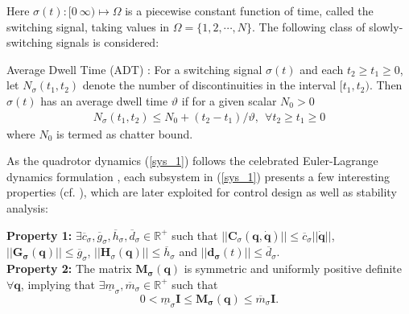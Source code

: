 Here $\sigma(t) : [0~\infty) \mapsto \Omega$ is a piecewise constant function of time, called the switching signal, taking values in $\Omega=\lbrace 1,2, \cdots,N \rbrace $. The following class of slowly-switching signals is considered: %
\begin{mydef}
	Average Dwell Time (ADT) \cite{hespanha1999stability}: For a switching signal $\sigma(t)$ and each $t_2 \geq t_1 \geq 0$, let $N_{\sigma}(t_1,t_2)$ denote the number of discontinuities in the interval $[t_1,t_2)$. Then $\sigma(t)$ has an average dwell time $\vartheta$ if for a given scalar $N_0 >0$
	\begin{align*}
	N_{\sigma}(t_1,t_2) \leq N_0 + (t_2-t_1)/\vartheta,~~ \forall t_2 \geq t_1 \geq 0
	\end{align*}
	where $N_0$ is termed as chatter bound.
\end{mydef}

As the quadrotor dynamics (\ref{sys_1}) follows the celebrated Euler-Lagrange dynamics formulation \cite{tang2015mixed}, each subsystem in (\ref{sys_1}) presents a few interesting properties (cf. \cite{spong2008robot}), which are later exploited for control design as well as stability analysis:

\noindent \textbf{Property 1:} $\exists \overline c_{\sigma }, \overline g_{\sigma }, \overline h_{\sigma },\overline{d}_{\sigma} \in \mathbb{R}^{+}$ such that $||\mathbf C_{\sigma}(\mathbf q,\dot{\mathbf q})|| \leq \overline c_{\sigma } ||\dot{\mathbf q}||$, $||\mathbf{G_{\sigma}(q)}|| \leq \overline g_{\sigma }$, $||\mathbf{H}_\sigma( \mathbf q)|| \leq \overline h_{\sigma }$ and $||\mathbf{d_{\sigma}}(t)|| \leq \overline{d}_{\sigma}$.\\
\textbf{Property 2:} The matrix $\mathbf{M_{\sigma}(q)}$ is symmetric and uniformly positive definite $\forall \mathbf{q}$, implying that $\exists \underline m_{\sigma}, \overline m_{\sigma} \in \mathbb{R}^{+}$ such that
\begin{equation}\label{prop 3}
0 < \underline m_{ \sigma} \mathbf I \leq \mathbf{M_{\sigma}(q)} \leq \overline m_{ \sigma} \mathbf I .
\end{equation}

